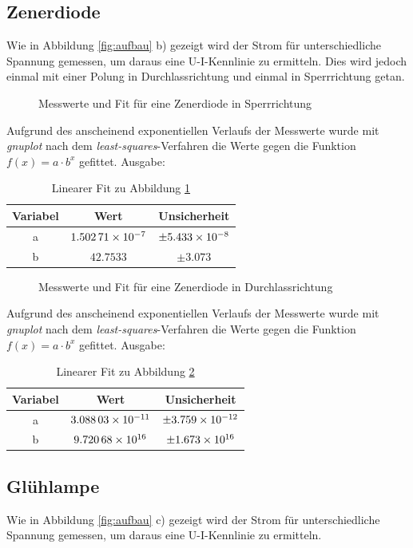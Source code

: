 \subsection{Zenerdiode}
Wie in Abbildung \ref{fig:aufbau} b) gezeigt wird der Strom für unterschiedliche Spannung gemessen, um daraus eine U-I-Kennlinie zu ermitteln. Dies wird jedoch einmal mit einer Polung in Durchlassrichtung und einmal in Sperrrichtung getan.
\begin{figure}[H]
\centering

\caption{Messwerte und Fit für eine Zenerdiode in Sperrrichtung}
\label{fig:diodesperr}
\end{figure}
Aufgrund des anscheinend exponentiellen Verlaufs der Messwerte wurde mit \emph{gnuplot} nach dem \emph{least-squares}-Verfahren die Werte gegen die Funktion $f(x)=a\cdot b^x$ gefittet. Ausgabe:
\begin{table}[H]
  \centering
  \begin{tabular}{c | c | c }
    Variabel   & Wert & Unsicherheit\\ \hline
    a & $\num{1.50271d-7}$ & $\pm\num{5.433d-8}$ \\
    b & $\num{42.7533}$ & $\pm\num{3.073}$
  \end{tabular}
  \caption{Linearer Fit zu Abbildung \ref{fig:diodesperr}}
  \label{tab:fitdiodesperr}
\end{table}
\begin{figure}[H]
\centering

\caption{Messwerte und Fit für eine Zenerdiode in Durchlassrichtung}
\label{fig:diodedurch}
\end{figure}
Aufgrund des anscheinend exponentiellen Verlaufs der Messwerte wurde mit \emph{gnuplot} nach dem \emph{least-squares}-Verfahren die Werte gegen die Funktion $f(x)=a\cdot b^x$ gefittet. Ausgabe:
\begin{table}[H]
  \centering
  \begin{tabular}{c | c | c }
    Variabel   & Wert & Unsicherheit\\ \hline
    a & $\num{3.08803d-11}$ & $\pm\num{3.759d-12}$ \\
    b & $\num{9,72068d16}$ & $\pm\num{1.673d16}$
  \end{tabular}
  \caption{Linearer Fit zu Abbildung \ref{fig:diodedurch}}
  \label{tab:fitdiodedurch}
\end{table}
\subsection{Glühlampe}
Wie in Abbildung \ref{fig:aufbau} c) gezeigt wird der Strom für unterschiedliche Spannung gemessen, um daraus eine U-I-Kennlinie zu ermitteln.


